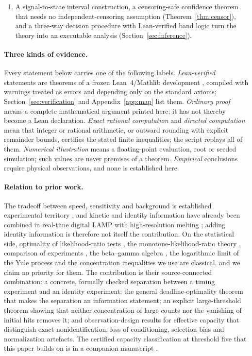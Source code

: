 \documentclass[11pt,a4paper]{article}
\theoremstyle{plain}
\theoremstyle{definition}
\theoremstyle{remark}
\begin{document}
\begin{enumerate}[label=(\roman*)]
\item A signal-to-state interval construction, a censoring-safe confidence theorem that needs no independent-censoring assumption (Theorem~\ref{thm:censor}), and a three-way decision procedure with Lean-verified band logic turn the theory into an executable analysis (Section~\ref{sec:inference}).
\end{enumerate}

\paragraph{Three kinds of evidence.}
Every statement below carries one of the following labels. \emph{Lean-verified} statements are theorems of a frozen Lean~4/Mathlib development \citep{demoura2021,mathlib2020}, compiled with warnings treated as errors and depending only on the standard axioms; Section~\ref{sec:verification} and Appendix~\ref{app:map} list them. \emph{Ordinary proof} means a complete mathematical argument printed here; it has not thereby become a Lean declaration. \emph{Exact rational computation} and \emph{directed computation} mean that integer or rational arithmetic, or outward rounding with explicit remainder bounds, certifies the stated finite inequalities; the script  replays all of them. \emph{Numerical illustration} means a floating-point evaluation, root or seeded simulation; such values are never premises of a theorem. \emph{Empirical} conclusions require physical observations, and none is established here.

\paragraph{Relation to prior work.}
The tradeoff between speed, sensitivity and background is established experimental territory \citep{rolando2019,hardinge2020,hardinge2019,schneider2019}, and kinetic and identity information have already been combined in real-time digital LAMP with high-resolution melting \citep{rolando2020}; adding identity information is therefore not itself the contribution. On the statistical side, optimality of likelihood-ratio tests \citep{neyman1933}, the monotone-likelihood-ratio theory \citep{karlinrubin1956,lehmannromano2005}, comparison of experiments \citep{blackwell1953}, the beta--gamma algebra \citep{lukacs1955}, the logarithmic limit of the Yule process \citep{kendall1948} and the concentration inequalities we use \citep{hoeffding1963,boucheron2013} are classical, and we claim no priority for them. The contribution is their source-connected combination: a concrete, formally checked separation between a timing experiment and an identity experiment; the general deadline-optimality theorem that makes the separation an information statement; an explicit large-threshold theorem showing that neither concentration of large counts nor the vanishing of initial hits removes it; and observation-design results for effective capacity that distinguish exact nonidentification, loss of conditioning, selection bias and normalization artefacts. The certified capacity classification at threshold five that this paper builds on is in a companion manuscript \citep{companion2026}.
\end{document}
